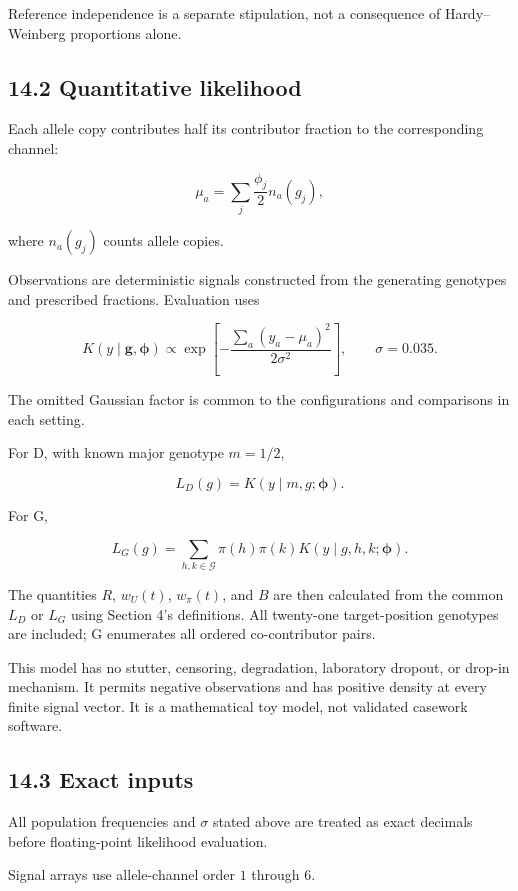 \documentclass[
]{article}
\begin{document}
Reference independence is a separate stipulation, not a consequence of
Hardy--Weinberg proportions alone.

\subsection{14.2 Quantitative likelihood}\label{quantitative-likelihood}

Each allele copy contributes half its contributor fraction to the
corresponding channel:

\[
\mu_a=\sum_j\frac{\phi_j}{2}n_a(g_j),
\]

where \(n_a(g_j)\) counts allele copies.

Observations are deterministic signals constructed from the generating
genotypes and prescribed fractions. Evaluation uses

\[
K(y\mid\mathbf g,\boldsymbol\phi)
\propto
\exp\left[
-\frac{\sum_a(y_a-\mu_a)^2}{2\sigma^2}
\right],
\qquad
\sigma=0.035.
\]

The omitted Gaussian factor is common to the configurations and
comparisons in each setting.

For D, with known major genotype \(m=1/2\),

\[
L_D(g)=K(y\mid m,g;\boldsymbol\phi).
\]

For G,

\[
L_G(g)=
\sum_{h,k\in\mathcal G}
\pi(h)\pi(k)
K(y\mid g,h,k;\boldsymbol\phi).
\]

The quantities \(R\), \(w_U(t)\), \(w_\pi(t)\), and \(B\) are then
calculated from the common \(L_D\) or \(L_G\) using Section 4's
definitions. All twenty-one target-position genotypes are included; G
enumerates all ordered co-contributor pairs.

This model has no stutter, censoring, degradation, laboratory dropout,
or drop-in mechanism. It permits negative observations and has positive
density at every finite signal vector. It is a mathematical toy model,
not validated casework software.

\subsection{14.3 Exact inputs}\label{exact-inputs}

All population frequencies and \(\sigma\) stated above are treated as
exact decimals before floating-point likelihood evaluation.

Signal arrays use allele-channel order \(1\) through \(6\).
\end{document}
